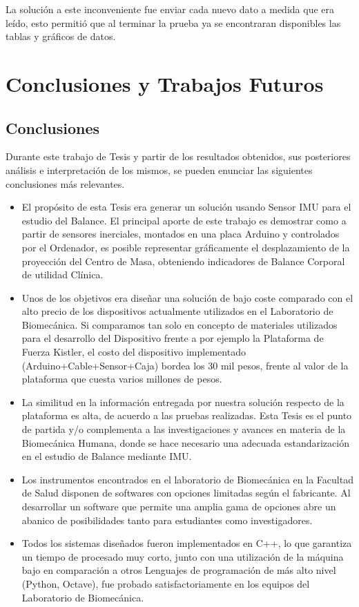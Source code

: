 \documentclass[12pt,a4paper]{article}
\begin{document}
La solución a este inconveniente fue enviar cada nuevo dato a medida que era leído, esto permitió que al terminar la prueba ya se encontraran disponibles las tablas y gráficos de datos.

\section{Conclusiones y Trabajos Futuros}
\subsection{Conclusiones}
Durante este trabajo de Tesis y partir de los resultados obtenidos, sus posteriores análisis e interpretación de los mismos, se pueden enunciar las siguientes conclusiones más relevantes.
\begin{itemize}
	\item El propósito de esta Tesis era generar un solución usando Sensor IMU para el estudio del Balance. El principal aporte de este trabajo es demostrar como a partir de sensores inerciales, montados en una placa Arduino y controlados por el Ordenador, es posible representar gráficamente el desplazamiento de la proyección del Centro de Masa, obteniendo indicadores de Balance Corporal de utilidad Clínica.
	
	\item Unos de los objetivos era diseñar una solución de bajo coste comparado con el alto precio de los dispositivos actualmente utilizados en el Laboratorio de Biomecánica. Si comparamos tan solo en concepto de materiales utilizados para el desarrollo del Dispositivo frente a por ejemplo la Plataforma de Fuerza Kistler, el costo del dispositivo implementado (Arduino+Cable+Sensor+Caja) bordea los 30 mil pesos, frente al valor de la plataforma que cuesta varios millones de pesos.
			
	\item La similitud en la información entregada por nuestra solución respecto de la plataforma es alta, de acuerdo a las pruebas realizadas. Esta Tesis es el punto de partida y/o complementa a las investigaciones y avances en materia de la Biomecánica Humana, donde se hace necesario una adecuada estandarización en el estudio de Balance mediante IMU.
	
	\item Los instrumentos encontrados en el laboratorio de Biomecánica en la Facultad de Salud disponen de softwares con opciones limitadas según el fabricante. Al desarrollar un software que permite una amplia gama de opciones abre un abanico de posibilidades tanto para estudiantes como investigadores.
	
	\item Todos los sistemas diseñados fueron implementados en C++, lo que garantiza un tiempo de procesado muy corto, junto con una utilización de la máquina bajo en comparación a otros Lenguajes de programación de más alto nivel (Python, Octave), fue probado satisfactoriamente en los equipos del Laboratorio de Biomecánica.
\end{itemize} 
\end{document}
